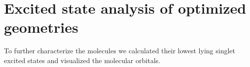 \begin{comment}
\begin{table}[H]
\caption{Total and relative energies of the the 10 conformers of cAB-1c-tolan. They are sorted by their respective population at room temperature.}
\centering
\begin{tabular}{@{}lllll@{}}
\toprule
molecule name            & Total energy (eV) & E\_rel (eV) & Pop   & Rank \\ \midrule
cAB-1c-tolan-crest-rot7  & -32328.584        & 0.000       & 0.142 & 1    \\
cAB-1c-tolan-crest-rot5  & -32328.582        & 0.002       & 0.132 & 2    \\
cAB-1c-tolan-crest-rot6  & -32328.582        & 0.002       & 0.130 & 3    \\
cAB-1c-tolan-crest-rot8  & -32328.579        & 0.005       & 0.117 & 4    \\
cAB-1c-tolan-crest-rot2  & -32328.572        & 0.012       & 0.087 & 5    \\
cAB-1c-tolan-crest-rot1  & -32328.571        & 0.014       & 0.083 & 6    \\
cAB-1c-tolan-crest-rot4  & -32328.570        & 0.015       & 0.080 & 7    \\
cAB-1c-tolan-crest-rot10 & -32328.569        & 0.015       & 0.078 & 8    \\
cAB-1c-tolan-crest-rot3  & -32328.569        & 0.015       & 0.078 & 9    \\
cAB-1c-tolan-crest-rot9  & -32328.567        & 0.017       & 0.072 & 10   \\ \bottomrule
\end{tabular}
\end{table}
\end{comment}
%
%
\section{Excited state analysis of optimized geometries}
To further characterize the molecules we calculated their lowest lying singlet excited states and visualized the molecular orbitals.
%
